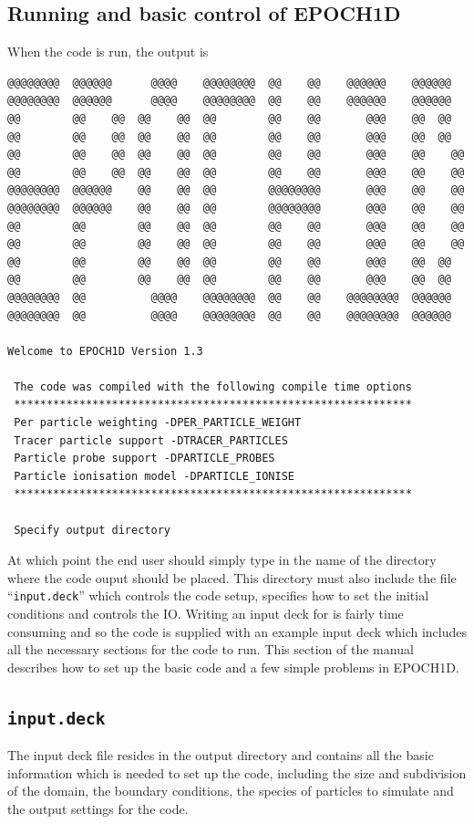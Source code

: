 \documentclass[12pt,a4paper]{article}
\newcommand{\boxverbatim}[1]{\begin{Verbatim}[obeytabs=true,frame=single,
  framerule=0.5mm,rulecolor=\color{warwickmid},formatcom=\color{black},label=#1]}
\newcommand{\code}[1]{{\texttt{#1}}}
\newcommand{\qtt}[1]{``{\code{#1}}''}
\newcommand{\EPOCH}{{\color{warwickdark}\fontfamily{phv}\selectfont{EPOCH}}}
\begin{document}
\subsection{Running {\EPOCH} and basic control of EPOCH1D}
When the code is run, the output is\\
\boxverbatim{Command line output}
@@@@@@@@  @@@@@@      @@@@    @@@@@@@@  @@    @@    @@@@@@    @@@@@@
@@@@@@@@  @@@@@@      @@@@    @@@@@@@@  @@    @@    @@@@@@    @@@@@@
@@        @@    @@  @@    @@  @@        @@    @@       @@@    @@  @@
@@        @@    @@  @@    @@  @@        @@    @@       @@@    @@  @@
@@        @@    @@  @@    @@  @@        @@    @@       @@@    @@    @@
@@        @@    @@  @@    @@  @@        @@    @@       @@@    @@    @@
@@@@@@@@  @@@@@@    @@    @@  @@        @@@@@@@@       @@@    @@    @@
@@@@@@@@  @@@@@@    @@    @@  @@        @@@@@@@@       @@@    @@    @@
@@        @@        @@    @@  @@        @@    @@       @@@    @@    @@
@@        @@        @@    @@  @@        @@    @@       @@@    @@    @@
@@        @@        @@    @@  @@        @@    @@       @@@    @@  @@
@@        @@        @@    @@  @@        @@    @@       @@@    @@  @@
@@@@@@@@  @@          @@@@    @@@@@@@@  @@    @@    @@@@@@@@  @@@@@@
@@@@@@@@  @@          @@@@    @@@@@@@@  @@    @@    @@@@@@@@  @@@@@@

Welcome to EPOCH1D Version 1.3

 The code was compiled with the following compile time options
 *************************************************************
 Per particle weighting -DPER_PARTICLE_WEIGHT
 Tracer particle support -DTRACER_PARTICLES
 Particle probe support -DPARTICLE_PROBES
 Particle ionisation model -DPARTICLE_IONISE
 *************************************************************

 Specify output directory
\end{Verbatim}

At which point the end user should simply type in the name of the directory
where the code ouput should be placed. This directory must also include the
file \qtt{input.deck} which controls the code setup, specifies how to set the
initial conditions and controls the IO. Writing an input deck for {\EPOCH} is
fairly time consuming and so the code is supplied with an example input deck
which includes all the necessary sections for the code to run. This section of
the manual describes how to set up the basic code and a few simple problems in
EPOCH1D.

\subsection{\code{input.deck}}
The input deck file resides in the output directory and contains all the basic
information which is needed to set up the code, including the size and
subdivision of the domain, the boundary conditions, the species of particles to
simulate and the output settings for the code.
\end{document}
